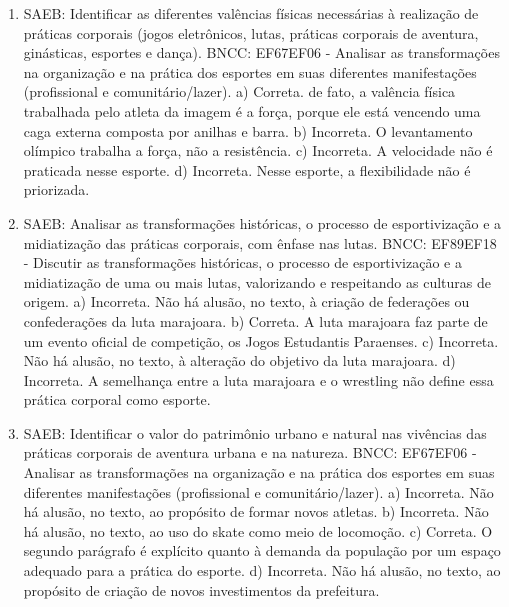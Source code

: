 
\begin{enumerate}
\item
SAEB: Identificar as diferentes valências físicas necessárias à
realização de práticas corporais (jogos eletrônicos, lutas, práticas
corporais de aventura, ginásticas, esportes e dança).
BNCC: EF67EF06 - Analisar as transformações na organização e na prática
dos esportes em suas diferentes manifestações (profissional e
comunitário/lazer).
a) Correta. de fato, a valência física trabalhada pelo atleta da imagem 
é a força, porque ele está vencendo uma caga externa composta por anilhas
e barra.
b) Incorreta. O levantamento olímpico trabalha a força, não a
resistência.
c) Incorreta. A velocidade não é praticada nesse esporte.
d) Incorreta. Nesse esporte, a flexibilidade não é priorizada.

\item
SAEB: Analisar as transformações históricas, o processo de
esportivização e a midiatização das práticas corporais, com ênfase nas
lutas.
BNCC: EF89EF18 - Discutir as transformações históricas, o processo de
esportivização e a midiatização de uma ou mais lutas, valorizando e
respeitando as culturas de origem.
a) Incorreta. Não há alusão, no texto, à criação de
federações ou confederações da luta marajoara. 
b) Correta. A luta marajoara faz parte de um evento oficial de
competição, os Jogos Estudantis Paraenses.
c) Incorreta. Não há alusão, no texto, à alteração do objetivo da luta
marajoara. 
d) Incorreta. A semelhança entre a luta marajoara e o
wrestling não define essa prática corporal como esporte.

\item
SAEB: Identificar o valor do patrimônio urbano e natural
nas vivências das práticas corporais de aventura urbana e na natureza.
BNCC: EF67EF06 - Analisar as transformações na organização e na prática
dos esportes em suas diferentes manifestações (profissional e
comunitário/lazer).
a) Incorreta. Não há alusão, no texto, ao propósito de formar novos
atletas.
b) Incorreta. Não há alusão, no texto, ao uso do skate como meio
de locomoção. 
c) Correta. O segundo parágrafo é explícito quanto à demanda da 
população por um espaço adequado para a prática do esporte.
d) Incorreta. Não há alusão, no texto, ao propósito de criação de novos investimentos da prefeitura.
\end{enumerate}


